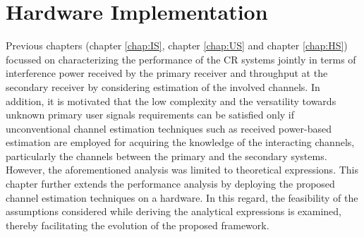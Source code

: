 \chapter{Hardware Implementation}
\label{chap:Field}

Previous chapters (chapter \ref{chap:IS}, chapter \ref{chap:US} and chapter \ref{chap:HS}) focussed on characterizing the performance of the CR systems jointly in terms of interference power received by the primary receiver and throughput at the secondary receiver by considering estimation of the involved channels. In addition, it is motivated that the low complexity and the versatility towards unknown primary user signals requirements can be satisfied only if unconventional channel estimation techniques such as received power-based estimation are employed for acquiring the knowledge of the interacting channels, particularly the channels between the primary and the secondary systems. However, the aforementioned analysis was limited to theoretical expressions. This chapter further extends the performance analysis by deploying the proposed channel estimation techniques on a hardware. In this regard, the feasibility of the assumptions considered while deriving the analytical expressions is examined, thereby facilitating the evolution of the proposed framework. %

